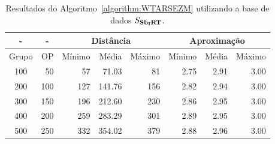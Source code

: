 \begin{table}[!htb]
  \caption{Resultados do Algoritmo~\ref{algorithm:WTARSEZM} utilizando a base de dados $S_{\textbf{Sb\textsubscript{I}RT}}{}$.}
  \label{table:UFTEBCWC}
  \centering
  \begin{tabular}{|c|r|r|r|r|r|r|r|}
    \hline
      -      & \multicolumn{1}{c|}{-} & \multicolumn{3}{c|}{Distância}             & \multicolumn{3}{c|}{Aproximação}           \\ \hline
    Grupo    & OP                     & Mínimo       & Média        & Máximo       & Mínimo       & Média        & Máximo       \\ \hline  
    100      & 50                     & 57           & 71.03        & 81           & 2.75         & 2.91         & 3.00         \\ \hline
    200      & 100                    & 127          & 141.76       & 156          & 2.82         & 2.94         & 3.00         \\ \hline
    300      & 150                    & 196          & 212.60       & 230          & 2.86         & 2.95         & 3.00         \\ \hline
    400      & 200                    & 259          & 283.29       & 301          & 2.89         & 2.95         & 3.00         \\ \hline
    500      & 250                    & 332          & 354.02       & 379          & 2.88         & 2.96         & 3.00         \\ \hline    
  \end{tabular}
\end{table}
